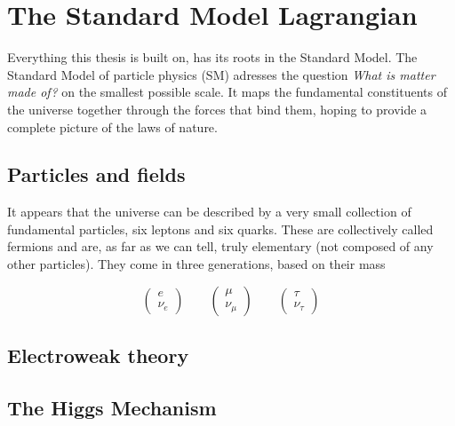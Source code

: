 \section{The Standard Model Lagrangian}
Everything this thesis is built on, has its roots in the Standard Model. The Standard Model of particle physics (SM) adresses the question \emph{What is matter made of?} on the smallest possible scale. It maps the fundamental constituents of the universe together through the forces that bind them, hoping to provide a complete picture of the laws of nature.
\subsection{Particles and fields}
It appears that the universe can be described by a very small collection of fundamental particles, six leptons and six quarks. These are collectively called fermions and are, as far as we can tell, truly elementary (not composed of any other particles). They come in three generations, based on their mass

\begin{equation}
\label{eqn:lepton_flavor_doublets}
\begin{pmatrix} e       \\ \nu_e      \end{pmatrix} \qquad
\begin{pmatrix} \mu     \\ \nu_{\mu}  \end{pmatrix} \qquad
\begin{pmatrix} \tau    \\ \nu_{\tau} \end{pmatrix}
\end{equation}

\subsection{Electroweak theory}
\subsection{The Higgs Mechanism}
